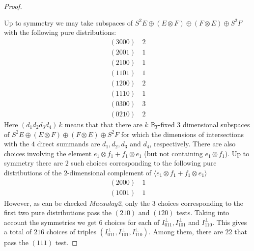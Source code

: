 \documentclass[12pt]{amsart}
\theoremstyle{definition}
\theoremstyle{remark}
\theoremstyle{definition}
\begin{document}
\begin{proof}
    {\tiny 
       \begin{center}
    \end{center}
    }
       
    Up to symmetry we may take subspaces of $S^2E \oplus (E\otimes F)\oplus (F\otimes E) \oplus S^2 F$ with the following pure distributions:
    \begin{align*}
        (3000) & \,2 \\
        (2001) & \,1 \\
        (2100) & \,1 \\
        (1101) & \,1 \\
        (1200) & \,2 \\
        (1110) & \,1 \\
        (0300) & \,3 \\
        (0210) & \,2 
    \end{align*}
Here $(d_1d_2d_3d_4) \,k$ means that that there are $k$ $\mathbb{B}_T$-fixed $3$ dimensional subspaces of $S^2E \oplus (E\otimes F)\oplus (F\otimes E) \oplus S^2 F$
for which the dimensions of intersections with the $4$ direct summands are $d_1,d_2,d_3$ and $d_4$, respectively.
There are also choices involving the element $e_1\otimes f_1 + f_1\otimes e_1$ (but not containing $e_1\otimes f_1$). Up to symmetry there are $2$ such choices 
 corresponding to the following pure distributions of the $2$-dimensional complement of $\langle e_1\otimes f_1 + f_1\otimes e_1\rangle$
   \begin{align*}
        (2000) & \,1 \\
        (1001) & \,1
    \end{align*}
    However, as can be checked \textit{Macaulay2}\cite{M2}, only the $3$ choices corresponding to the first two pure distributions pass the $(210)$ and $(120)$ tests. 
    Taking into account the symmetries we get $6$ choices for each of $I^\perp_{011}, I^\perp_{101}$ and $I^\perp_{110}$.
    This gives a total of $216$ choices of triples $(I^\perp_{011}, I^\perp_{101}, I^\perp_{110})$. Among them, there are $22$ that pass the $(111)$ test.
    

\end{proof}
\end{document}
